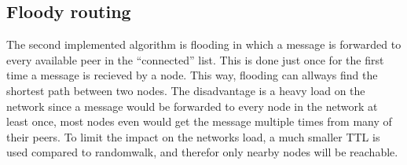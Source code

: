 \subsection{Floody routing}

The second implemented algorithm is flooding in which a message is forwarded to every available peer in the ``connected'' list. This is done just once for the first time a message is recieved by a node. This way, flooding can allways find the shortest path between two nodes. The disadvantage is a heavy load on the network since a message would be forwarded to every node in the network at least once, most nodes even would get the message multiple times from many of their peers. To limit the impact on the networks load, a much smaller TTL is used compared to randomwalk, and therefor only nearby nodes will be reachable.

